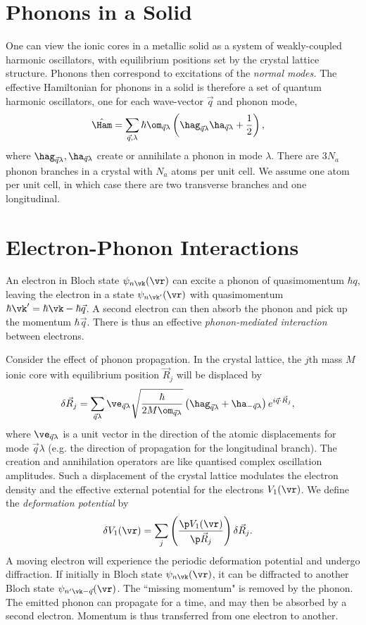 \documentclass[a4paper, 11pt, normalem]{report}
\begin{document}
\section{Phonons in a Solid}
One can view the ionic cores in a metallic solid as a system of weakly-coupled harmonic oscillators, with equilibrium positions set by the crystal lattice structure.
Phonons then correspond to excitations of the \emph{normal modes.}
The effective Hamiltonian for phonons in a solid is therefore a set of quantum harmonic oscillators, one for each wave-vector $\vec{q}$ and phonon mode,
\begin{align}
    \hat{\Ham} &= \sum_{\vec{q},\lambda}\hbar\om_{\vec{q}\lambda}\left(\hag_{\vec{q}\lambda}\ha_{\vec{q}\lambda}+\frac12\right),
\end{align}
where $\hag_{\vec{q}\lambda},\ha_{\vec{q}\lambda}$ create or annihilate a phonon in mode $\lambda$.
There are $3N_a$ phonon branches in a crystal with $N_a$ atoms per unit cell.
We assume one atom per unit cell, in which case there are two transverse branches and one longitudinal.

\section{Electron-Phonon Interactions}
An electron in Bloch state $\psi_{n\vk}(\vr)$ can excite a phonon of quasimomentum $\hbar q$, leaving the electron in a state $\psi_{n\vk'}(\vr)$ with quasimomentum $\hbar\vk'=\hbar\vk-\hbar\vec{q}$.
A second electron can then absorb the phonon and pick up the momentum $\hbar\vec{q}$.
There is thus an effective \emph{phonon-mediated interaction} between electrons.

Consider the effect of phonon propagation.
In the crystal lattice, the $j$th mass $M$ ionic core with equilibrium position $\vec{R}_j$ will be displaced by
\begin{align}
    \delta\vec{R}_j &= \sum_{\vec{q}\lambda} \ve_{\vec{q}\lambda}\sqrt{\frac{\hbar}{2M\om_{\vec{q}\lambda}}}\left(\hag_{\vec{q}\lambda}+\ha_{-\vec{q}\lambda}\right)e^{i\vec{q}\cdot\vec{R}_j},
\end{align}
where $\ve_{\vec{q}\lambda}$ is a unit vector in the direction of the atomic displacements for mode $\vec{q}\lambda$ (e.g. the direction of propagation for the longitudinal branch).
The creation and annihilation operators are like quantised complex oscillation amplitudes.
Such a displacement of the crystal lattice modulates the electron density and the effective external potential for the electrons $V_1(\vr)$.
We define the \emph{deformation potential} by
\begin{align}
    \delta V_1(\vr) &= \sum_j \left(\frac{\p V_1(\vr)}{\p\vec{R}_j}\right)\delta\vec{R}_j.
\end{align}
A moving electron will experience the periodic deformation potential and undergo diffraction.
If initially in Bloch state $\psi_{n\vk}(\vr)$, it can be diffracted to another Bloch state $\psi_{n'\vk-\vec{q}}(\vr)$.
The ``missing momentum" is removed by the phonon.
The emitted phonon can propagate for a time, and may then be absorbed by a second electron.
Momentum is thus transferred from one electron to another.
\end{document}
